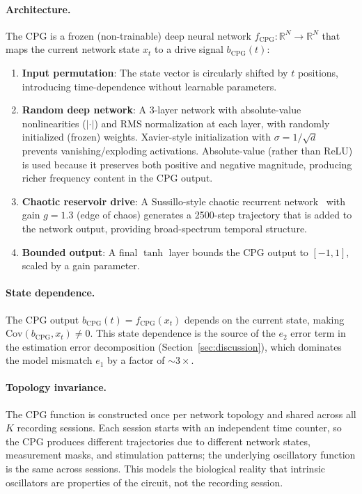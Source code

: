 \documentclass{article}
\begin{document}
\paragraph{Architecture.}
The CPG is a frozen (non-trainable) deep neural network $f_{\text{CPG}}: \mathbb{R}^N \to \mathbb{R}^N$ that maps the current network state $x_t$ to a drive signal $b_{\text{CPG}}(t)$:
\begin{enumerate}
    \item \textbf{Input permutation}: The state vector is circularly shifted by $t$ positions, introducing time-dependence without learnable parameters.
    \item \textbf{Random deep network}: A 3-layer network with absolute-value nonlinearities ($|\cdot|$) and RMS normalization at each layer, with randomly initialized (frozen) weights. Xavier-style initialization with $\sigma = 1/\sqrt{d}$ prevents vanishing/exploding activations. Absolute-value (rather than ReLU) is used because it preserves both positive and negative magnitude, producing richer frequency content in the CPG output.
    \item \textbf{Chaotic reservoir drive}: A Sussillo-style chaotic recurrent network~\citep{sussillo2009generating} with gain $g = 1.3$ (edge of chaos) generates a 2500-step trajectory that is added to the network output, providing broad-spectrum temporal structure.
    \item \textbf{Bounded output}: A final $\tanh$ layer bounds the CPG output to $[-1, 1]$, scaled by a gain parameter.
\end{enumerate}

\paragraph{State dependence.}
The CPG output $b_{\text{CPG}}(t) = f_{\text{CPG}}(x_t)$ depends on the current state, making $\text{Cov}(b_{\text{CPG}}, x_t) \neq 0$.
This state dependence is the source of the $e_2$ error term in the estimation error decomposition (Section~\ref{sec:discussion}), which dominates the model mismatch $e_1$ by a factor of $\sim 3\times$.

\paragraph{Topology invariance.}
The CPG function is constructed once per network topology and shared across all $K$ recording sessions.
Each session starts with an independent time counter, so the CPG produces different trajectories due to different network states, measurement masks, and stimulation patterns; the underlying oscillatory function is the same across sessions.
This models the biological reality that intrinsic oscillators are properties of the circuit, not the recording session.
\end{document}
